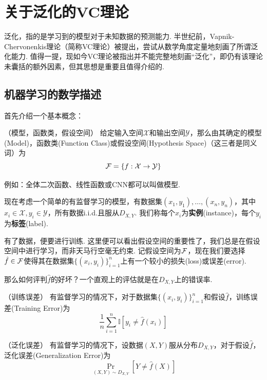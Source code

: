 \chapter{关于泛化的VC理论}

泛化，指的是学习到的模型对于未知数据的预测能力. 半世纪前，Vapnik-Chervonenkis理论（简称VC理论）被提出，尝试从数学角度定量地刻画了所谓泛化能力. 值得一提，现如今VC理论被指出并不能完整地刻画“泛化”，即仍有该理论未囊括的额外因素，但其思想是重要且值得介绍的. 

\section{机器学习的数学描述}

首先介绍一个基本概念：
\begin{definition} （模型，函数类，假设空间）
    给定输入空间$\mathcal{X}$和输出空间$\mathcal{Y}$，那么由其确定的模型(Model)，函数类(Function Class)或假设空间(Hypothesis Space)（这三者是同义词）为 
    \[
    \mathcal{F} = \{f:\mathcal{X} \rightarrow \mathcal{Y}\}
    \]
\end{definition}

例如：全体二次函数、线性函数或CNN都可以叫做模型. 

\medskip
现在考虑一个简单的有监督学习的模型，有数据集$(x_1, y_1), \dots, (x_n, y_n)$，其中$x_i \in \mathcal{X}, y_i \in \mathcal{Y}$，所有数据i.i.d.且服从$D_{X,Y}$. 我们称每个$x_i$为\textbf{实例}(instance)，每个$y_i$为\textbf{标签}(label).

有了数据，便要进行训练. 这里便可以看出假设空间的重要性了，我们总是在假设空间中进行学习，而非天马行空毫无约束. 记假设空间为$\mathcal{F}$，现在我们要选择$\hat f \in \mathcal{F}$使得其在数据集$\{(x_i, y_i)\}_{i=1}^n$上有一个较小的损失(loss)或误差(error).

那么如何评判$\hat f$的好坏？一个直观上的评估就是在$D_{X,Y}$上的错误率. 

\begin{definition}（训练误差） 
    有监督学习的情况下，对于数据集$\{(x_i, y_i)\}_{i=1}^n$和假设$\hat f$，训练误差(Training Error)为
    \[
    \dfrac{1}{n} \sum_{i=1}^n \mathbb{I}[y_i \neq \hat f(x_i)]
    \]
\end{definition}

\begin{definition}（泛化误差） 
    有监督学习的情况下，设数据$(X, Y)$服从分布$D_{X,Y}$，对于假设$\hat f$，泛化误差(Generalization Error)为
    \[
    \Pr_{(X, Y) \sim D_{X,Y}}\left[
        Y \neq \hat f(X)
    \right]
    \]
\end{definition}

